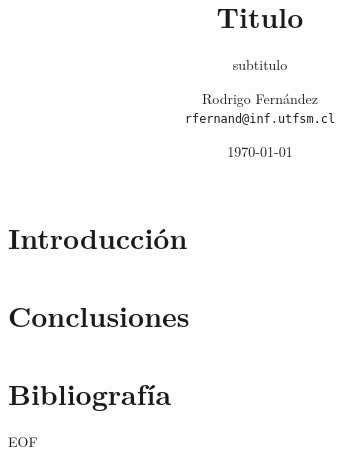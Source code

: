 \documentclass[12pt]{beamer}
\title{Titulo}
\subtitle{subtitulo}
\author[R. Fernández]{Rodrigo Fernández \\ \small{\texttt{rfernand@inf.utfsm.cl}}}
\institute[]{Universidad Técnica Federico Santa María}
\date{\today}
\begin{document}

    \frame{\titlepage}
    \frame{\tableofcontents}
	\section{Introducción}
    
    \section{Conclusiones}
    
    \section{Bibliografía}
    

\frame
{
	\vspace{2cm}
	\begin{center}
		\Large{EOF}
	\end{center}
}
\end{document}

